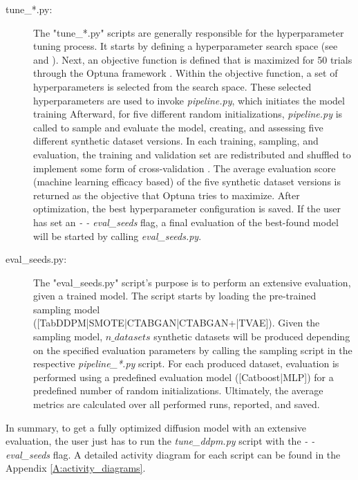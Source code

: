 \begin{description}
	\item[tune\_*.py\footnotemark:]
		The "tune\_*.py" scripts are generally responsible for the hyperparameter tuning process.
		It starts by defining a hyperparameter search space (see \cite[Table 1, p. 4]{kotelnikov2022TabDDPMModellingTabular} and \cite[Table 7-11, p. 13 f.]{kotelnikov2022TabDDPMModellingTabular}).
		Next, an objective function is defined that is maximized for 50 trials through the Optuna framework \cite{optuna_2019}.
		Within the objective function, a set of hyperparameters is selected from the search space.
		These selected hyperparameters are used to invoke \textit{pipeline.py}, which initiates the model training
		Afterward, for five different random initializations, \textit{pipeline.py} is called to sample and evaluate the model, creating, and assessing five different synthetic dataset versions.
		In each training, sampling, and evaluation, the training and validation set are redistributed and shuffled to implement some form of cross-validation \cite{kohavi2001StudyCrossValidationBootstrap}.
		The average evaluation score (machine learning efficacy based) of the five synthetic dataset versions is returned as the objective that Optuna tries to maximize.
		After optimization, the best hyperparameter configuration is saved.
		If the user has set an \textit{- - eval\_seeds} flag, a final evaluation of the best-found model will be started by calling \textit{eval\_seeds.py}.
		
	\item[eval\_seeds.py:]
		The "eval\_seeds.py" script's purpose is to perform an extensive evaluation, given a trained model.
		The script starts by loading the pre-trained sampling model \\([TabDDPM|SMOTE|CTABGAN|CTABGAN+|TVAE]).
		Given the sampling model, $n\_datasets$ synthetic datasets will be produced depending on the specified evaluation parameters by calling the sampling script in the respective \textit{pipeline\_*.py} script.
		For each produced dataset, evaluation is performed using a predefined evaluation model ([Catboost|MLP]) for a predefined number of random initializations.
		Ultimately, the average metrics are calculated over all performed runs, reported, and saved.
\end{description}

In summary, to get a fully optimized diffusion model with an extensive evaluation, the user just has to run the \textit{tune\_ddpm.py} script with the \textit{- - eval\_seeds} flag.
A detailed activity diagram for each script can be found in the Appendix \ref{A:activity_diagrams}.

